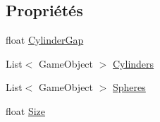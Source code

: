 \subsection*{Propriétés}
\begin{DoxyCompactItemize}
\item 
float \hyperlink{class_animation_a8d437d68fafe3193dc3b3bb652cfb4a8}{Cylinder\+Gap}
\item 
List$<$ Game\+Object $>$ \hyperlink{class_animation_ada29c182dd9f01da8c5ee8f5afbf78cc}{Cylinders}
\item 
List$<$ Game\+Object $>$ \hyperlink{class_animation_a54aef17d1bdc63728b435debc61a516f}{Spheres}
\item 
float \hyperlink{class_animation_a2f2503f2087a873db779061cbf5ac188}{Size}
\end{DoxyCompactItemize}
